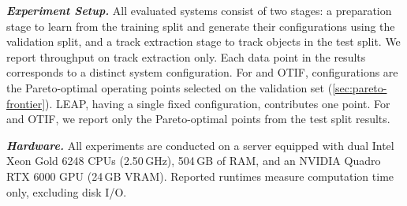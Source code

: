 \textbf{\em Experiment Setup.}
All evaluated systems consist of two stages:
a preparation stage to learn from the training split and generate their configurations using the validation split,
and a track extraction stage to track objects in the test split.
We report throughput on track extraction only.
Each data point in the results corresponds to a distinct system configuration.
For \sys{} and OTIF,
configurations are the Pareto-optimal operating points selected on the validation set (\autoref{sec:pareto-frontier}).
LEAP, having a single fixed configuration, contributes one point.
For \sys{} and OTIF,
we report only the Pareto-optimal points from the test split results.

\textbf{\em Hardware.}
All experiments are conducted on a server equipped with dual Intel Xeon Gold 6248 CPUs (2.50\,GHz),
504\,GB of RAM,
and an NVIDIA Quadro RTX 6000 GPU (24\,GB VRAM).
Reported runtimes measure computation time only,
excluding disk I/O.


